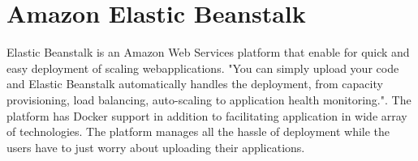 \section{Amazon Elastic Beanstalk}
Elastic Beanstalk is an Amazon Web Services platform that enable for quick
and easy deployment of scaling webapplications. "You can simply upload your
code and Elastic Beanstalk automatically handles the deployment, from
capacity provisioning, load balancing, auto-scaling to application health
monitoring."\cite{hid-sp18-411-amazonelasticbeanstalk}. The platform has
Docker support in addition to facilitating application in wide array of
technologies. The platform manages all the hassle of deployment while the
users have to just worry about uploading their applications.